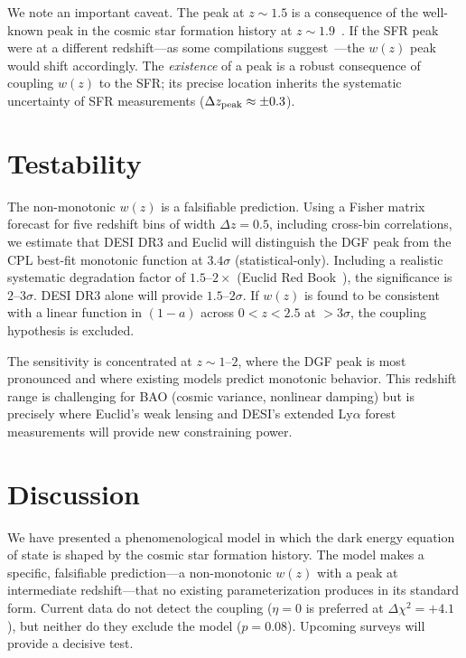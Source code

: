 \documentclass[12pt,a4paper]{article}
\begin{document}
We note an important caveat. The peak at $z\sim1.5$ is a consequence of the well-known peak in the cosmic star formation history at $z\sim1.9$~\cite{madau2014}. If the SFR peak were at a different redshift---as some compilations suggest~\cite{behroozi2019}---the $w(z)$ peak would shift accordingly. The {\it existence} of a peak is a robust consequence of coupling $w(z)$ to the SFR; its precise location inherits the systematic uncertainty of SFR measurements ($\Delta z_{\rm peak}\approx\pm0.3$).

\section*{Testability}

The non-monotonic $w(z)$ is a falsifiable prediction. Using a Fisher matrix forecast for five redshift bins of width $\Delta z=0.5$, including cross-bin correlations, we estimate that DESI DR3 and Euclid will distinguish the DGF peak from the CPL best-fit monotonic function at $3.4\sigma$ (statistical-only). Including a realistic systematic degradation factor of $1.5$--$2\times$ (Euclid Red Book~\cite{euclid2011}), the significance is $2$--$3\sigma$. DESI DR3 alone will provide $1.5$--$2\sigma$. If $w(z)$ is found to be consistent with a linear function in $(1-a)$ across $0<z<2.5$ at $>3\sigma$, the coupling hypothesis is excluded.

The sensitivity is concentrated at $z\sim1$--$2$, where the DGF peak is most pronounced and where existing models predict monotonic behavior. This redshift range is challenging for BAO (cosmic variance, nonlinear damping) but is precisely where Euclid's weak lensing and DESI's extended Ly$\alpha$ forest measurements will provide new constraining power.

\section*{Discussion}

We have presented a phenomenological model in which the dark energy equation of state is shaped by the cosmic star formation history. The model makes a specific, falsifiable prediction---a non-monotonic $w(z)$ with a peak at intermediate redshift---that no existing parameterization produces in its standard form. Current data do not detect the coupling ($\eta=0$ is preferred at $\Delta\chi^2=+4.1$), but neither do they exclude the model ($p=0.08$). Upcoming surveys will provide a decisive test.
\end{document}
